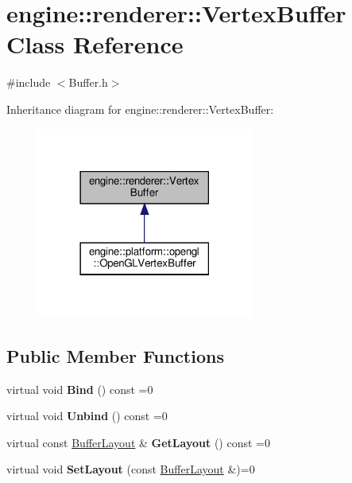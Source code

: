\hypertarget{classengine_1_1renderer_1_1VertexBuffer}{}\section{engine\+:\+:renderer\+:\+:Vertex\+Buffer Class Reference}
\label{classengine_1_1renderer_1_1VertexBuffer}


{\ttfamily \#include $<$Buffer.\+h$>$}



Inheritance diagram for engine\+:\+:renderer\+:\+:Vertex\+Buffer\+:
\nopagebreak
\begin{figure}[H]
\begin{center}
\leavevmode
\includegraphics[width=201pt]{classengine_1_1renderer_1_1VertexBuffer__inherit__graph}
\end{center}
\end{figure}
\subsection*{Public Member Functions}
\begin{DoxyCompactItemize}
\item
\mbox{\label{classengine_1_1renderer_1_1VertexBuffer_acccb2af8de4a3a557f308757010a1fe7}}
virtual void {\bfseries Bind} () const =0
\item
\mbox{\label{classengine_1_1renderer_1_1VertexBuffer_ab2bc17d0e37c25c369367ea6b1137283}}
virtual void {\bfseries Unbind} () const =0
\item
\mbox{\label{classengine_1_1renderer_1_1VertexBuffer_ab769bac40b3e30891fa4d5ee35ae6f2b}}
virtual const \hyperlink{classengine_1_1renderer_1_1BufferLayout}{Buffer\+Layout} \& {\bfseries Get\+Layout} () const =0
\item
\mbox{\label{classengine_1_1renderer_1_1VertexBuffer_a2885e3856bfb698178b6cd00a4dc7aab}}
virtual void {\bfseries Set\+Layout} (const \hyperlink{classengine_1_1renderer_1_1BufferLayout}{Buffer\+Layout} \&)=0
\end{DoxyCompactItemize}
